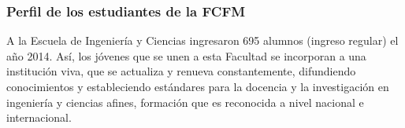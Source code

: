 \subsubsection{Perfil de los estudiantes de la FCFM}\label{prefil_fcfm}

A la Escuela de Ingeniería y Ciencias ingresaron 695 alumnos (ingreso regular) el año 2014. Así,
los jóvenes que se unen a esta Facultad se incorporan a una institución viva, que se actualiza y
renueva constantemente, difundiendo conocimientos y estableciendo estándares para la docencia
y la investigación en ingeniería y ciencias afines, formación que es reconocida a nivel nacional e
internacional.





